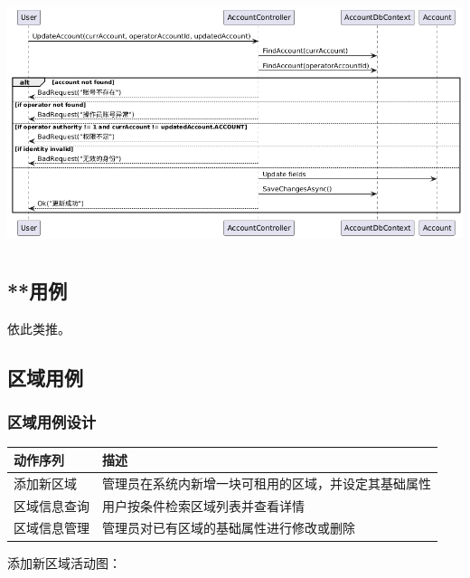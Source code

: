 \documentclass[]{article}
\begin{document}
\includegraphics[width=5.64167in,height=2.86458in]{media/media/image7.png}

\hypertarget{ux7528ux4f8b}{%
  \subsection{**用例}\label{ux7528ux4f8b}}

依此类推。

\hypertarget{ux7528ux4f8b-1}{%
  \subsection{区域用例}\label{ux7528ux4f8b-1}}
\hypertarget{ux7528ux4f8b-1ux8bbeux8ba1}{%
  \subsubsection{区域用例设计}\label{ux7528ux4f8b-1ux8bbeux8ba1}}


\begin{longtable}[]{@{}ll@{}}
  \toprule
  \textbf{动作序列} & \textbf{描述}                \\
  \midrule
  \endhead
  添加新区域         & 管理员在系统内新增一块可租用的区域，并设定其基础属性 \\
  区域信息查询        & 用户按条件检索区域列表并查看详情           \\
  区域信息管理        & 管理员对已有区域的基础属性进行修改或删除       \\
  \bottomrule
\end{longtable}

添加新区域活动图：
\end{document}
